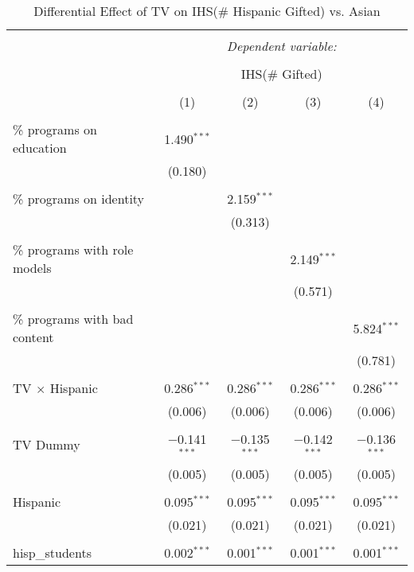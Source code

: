 
\begin{table}[!htbp] \centering 
  \caption{Differential Effect of TV on IHS(\# Hispanic Gifted) vs. Asian} 
  \label{} 
\begin{tabular}{@{\extracolsep{-2pt}}lcccc} 
\\[-1.8ex]\hline 
\hline \\[-1.8ex] 
 & \multicolumn{4}{c}{\textit{Dependent variable:}} \\ 
\cline{2-5} 
\\[-1.8ex] & \multicolumn{4}{c}{IHS(\# Gifted)} \\ 
\\[-1.8ex] & (1) & (2) & (3) & (4)\\ 
\hline \\[-1.8ex] 
 \% programs on education & 1.490$^{***}$ &  &  &  \\ 
  & (0.180) &  &  &  \\ 
  & & & & \\ 
 \% programs on identity &  & 2.159$^{***}$ &  &  \\ 
  &  & (0.313) &  &  \\ 
  & & & & \\ 
 \% programs with role models &  &  & 2.149$^{***}$ &  \\ 
  &  &  & (0.571) &  \\ 
  & & & & \\ 
 \% programs with bad content &  &  &  & 5.824$^{***}$ \\ 
  &  &  &  & (0.781) \\ 
  & & & & \\ 
 TV $\times$ Hispanic & 0.286$^{***}$ & 0.286$^{***}$ & 0.286$^{***}$ & 0.286$^{***}$ \\ 
  & (0.006) & (0.006) & (0.006) & (0.006) \\ 
  & & & & \\ 
 TV Dummy & $-$0.141$^{***}$ & $-$0.135$^{***}$ & $-$0.142$^{***}$ & $-$0.136$^{***}$ \\ 
  & (0.005) & (0.005) & (0.005) & (0.005) \\ 
  & & & & \\ 
 Hispanic & 0.095$^{***}$ & 0.095$^{***}$ & 0.095$^{***}$ & 0.095$^{***}$ \\ 
  & (0.021) & (0.021) & (0.021) & (0.021) \\ 
  & & & & \\ 
 hisp\_students & 0.002$^{***}$ & 0.001$^{***}$ & 0.001$^{***}$ & 0.001$^{***}$ \\ 

\end{tabular}
\end{table}
